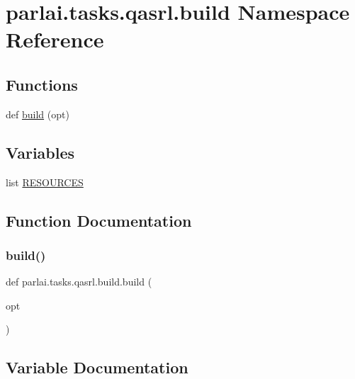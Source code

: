 \hypertarget{namespaceparlai_1_1tasks_1_1qasrl_1_1build}{}\section{parlai.\+tasks.\+qasrl.\+build Namespace Reference}
\label{namespaceparlai_1_1tasks_1_1qasrl_1_1build}
\subsection*{Functions}
\begin{DoxyCompactItemize}
\item 
def \hyperlink{namespaceparlai_1_1tasks_1_1qasrl_1_1build_afe77ee1662611aab5f5520df1fc49ff6}{build} (opt)
\end{DoxyCompactItemize}
\subsection*{Variables}
\begin{DoxyCompactItemize}
\item 
list \hyperlink{namespaceparlai_1_1tasks_1_1qasrl_1_1build_abcf1f700787a9a9a37a796a49d5727d0}{R\+E\+S\+O\+U\+R\+C\+ES}
\end{DoxyCompactItemize}


\subsection{Function Documentation}
\mbox{\label{namespaceparlai_1_1tasks_1_1qasrl_1_1build_afe77ee1662611aab5f5520df1fc49ff6}} 
\subsubsection{\texorpdfstring{build()}{build()}}
{\footnotesize\ttfamily def parlai.\+tasks.\+qasrl.\+build.\+build (\begin{DoxyParamCaption}\item[{}]{opt }\end{DoxyParamCaption})}



\subsection{Variable Documentation}
\mbox{\label{namespaceparlai_1_1tasks_1_1qasrl_1_1build_abcf1f700787a9a9a37a796a49d5727d0}} 
